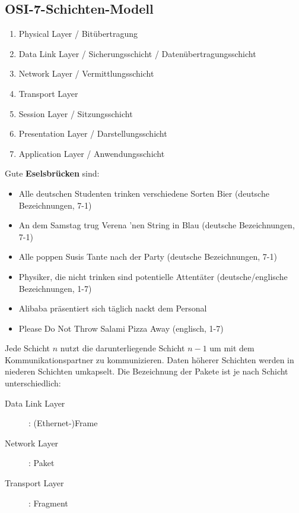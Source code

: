 \documentclass{article} %
\begin{document}
\subsection{OSI-7-Schichten-Modell}

\begin{enumerate}
	\item Physical Layer / Bitübertragung
	\item Data Link Layer / Sicherungsschicht / Datenübertragungsschicht
	\item Network Layer / Vermittlungsschicht
	\item Transport Layer
	\item Session Layer / Sitzungsschicht
	\item Presentation Layer / Darstellungsschicht
	\item Application Layer / Anwendungsschicht
\end{enumerate}

Gute \textbf{Eselsbrücken} sind:
\begin{itemize}
	\item Alle deutschen Studenten trinken verschiedene Sorten Bier (deutsche Bezeichnungen, 7-1)
	\item An dem Samstag trug Verena 'nen String in Blau (deutsche Bezeichnungen, 7-1)
	\item Alle poppen Susis Tante nach der Party (deutsche Bezeichnungen, 7-1)
	\item Physiker, die nicht trinken sind potentielle Attentäter (deutsche/englische Bezeichnungen, 1-7)
	\item Alibaba präsentiert sich täglich nackt dem Personal
	\item  Please Do Not Throw Salami Pizza Away (englisch, 1-7)
\end{itemize}

Jede Schicht $n$ nutzt die darunterliegende Schicht $n-1$ um mit dem Kommunikationspartner zu kommunizieren.
Daten höherer Schichten werden in niederen Schichten umkapselt.
Die Bezeichnung der Pakete ist je nach Schicht unterschiedlich:
\begin{description}
	\item[Data Link Layer]: (Ethernet-)Frame
	\item[Network Layer]: Paket
	\item[Transport Layer]: Fragment
\end{description}
\end{document}
